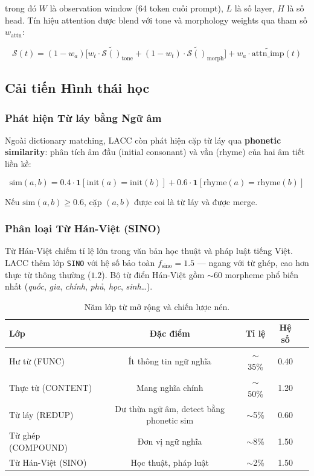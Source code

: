 \documentclass[12pt,a4paper]{article}
\newcommand{\score}[1]{\mathcal{S}(#1)}      %
\newcommand{\method}[1]{\textsc{#1}}         %
\newcommand{\viet}[1]{\textit{#1}}           %
\begin{document}
trong đó $W$ là observation window (64 token cuối prompt), $L$ là số layer, $H$ là số head. Tín hiệu attention được blend với tone và morphology weights qua tham số $w_{\text{attn}}$:

\begin{equation}\label{eq:combined_v2}
    \score{t} = (1 - w_a)\big[w_t \cdot \tilde{\score{}}_{\text{tone}} + (1-w_t) \cdot \tilde{\score{}}_{\text{morph}}\big] + w_a \cdot \tilde{\text{attn\_imp}}(t)
\end{equation}

\subsection{Cải tiến Hình thái học}

\subsubsection{Phát hiện Từ láy bằng Ngữ âm}

Ngoài dictionary matching, \method{LACC} còn phát hiện cặp từ láy qua \textbf{phonetic similarity}: phân tích âm đầu (initial consonant) và vần (rhyme) của hai âm tiết liền kề:

\begin{equation}\label{eq:phonetic_sim}
    \text{sim}(a, b) = 0.4 \cdot \mathbf{1}[\text{init}(a) = \text{init}(b)] + 0.6 \cdot \mathbf{1}[\text{rhyme}(a) = \text{rhyme}(b)]
\end{equation}

Nếu $\text{sim}(a, b) \geq 0.6$, cặp $(a, b)$ được coi là từ láy và được merge.

\subsubsection{Phân loại Từ Hán-Việt (SINO)}

Từ Hán-Việt chiếm tỉ lệ lớn trong văn bản học thuật và pháp luật tiếng Việt. \method{LACC} thêm lớp \texttt{SINO} với hệ số bảo toàn $f_{\text{sino}} = 1.5$ --- ngang với từ ghép, cao hơn thực từ thông thường ($1.2$). Bộ từ điển Hán-Việt gồm $\sim$60 morpheme phổ biến nhất (\viet{quốc}, \viet{gia}, \viet{chính}, \viet{phủ}, \viet{học}, \viet{sinh}\ldots).

\begin{table}[H]
\centering
\caption{Năm lớp từ mở rộng và chiến lược nén.}
\label{tab:word_classes_v2}
\begin{tabular}{lcccc}
\toprule
\textbf{Lớp} & \textbf{Đặc điểm} & \textbf{Tỉ lệ} & \textbf{Hệ số} \\
\midrule
Hư từ (FUNC) & Ít thông tin ngữ nghĩa & $\sim$35\% & 0.40 \\
Thực từ (CONTENT) & Mang nghĩa chính & $\sim$50\% & 1.20 \\
Từ láy (REDUP) & Dư thừa ngữ âm, detect bằng phonetic sim & $\sim$5\% & 0.60 \\
Từ ghép (COMPOUND) & Đơn vị ngữ nghĩa & $\sim$8\% & 1.50 \\
Từ Hán-Việt (SINO) & Học thuật, pháp luật & $\sim$2\% & 1.50 \\
\bottomrule
\end{tabular}
\end{table}
\end{document}
